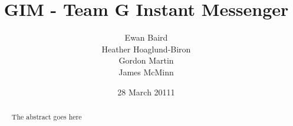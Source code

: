\documentclass{l3proj}
\begin{document}
\title{GIM - Team G Instant Messenger}
\author{Ewan Baird \\
Heather Hoaglund-Biron \\
Gordon Martin \\
James McMinn}
\date{28 March 20111}
\maketitle
\begin{abstract}

The abstract goes here

\end{abstract}
\educationalconsent
\tableofcontents















\end{document}
